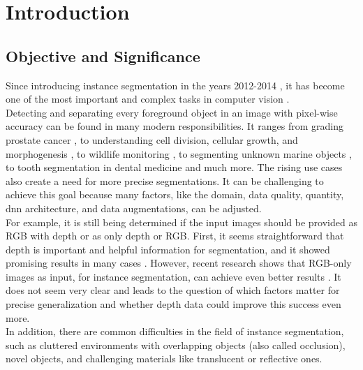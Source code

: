 
\chapter{Introduction}
\label{chap:kapitel1}



	\section{Objective and Significance}    %
	\label{sec:objective-and-importance}	
		Since introducing instance segmentation in the years 2012-2014 \cite{Yang2012}\cite{Silbermann2012}\cite{Hariharan2014}, it has become one of the most important and complex tasks in computer vision \cite{Sharma2022}. \\
		Detecting and separating every foreground object in an image with pixel-wise accuracy can be found in many modern responsibilities. It ranges from grading prostate cancer \cite{Hassan2022}, to understanding cell division, cellular growth, and morphogenesis \cite{Kar2022}, to wildlife monitoring \cite{Haucke2021}, to segmenting unknown marine objects \cite{Hu2024}, to tooth segmentation in dental medicine \cite{Brahmi2023} and much more. The rising use cases also create a need for more precise segmentations. It can be challenging to achieve this goal because many factors, like the domain, data quality, quantity, \ac{dnn} architecture, and data augmentations, can be adjusted.\\
		For example, it is still being determined if the input images should be provided as RGB with depth or as only depth or RGB. First, it seems straightforward that depth is important and helpful information for segmentation, and it showed promising results in many cases \cite{Danielczuk2019}\cite{Xie2021}. However, recent research shows that RGB-only images as input, for instance segmentation, can achieve even better results \cite{Raj2023}. It does not seem very clear and leads to the question of which factors matter for precise generalization and whether depth data could improve this success even more.\\
		In addition, there are common difficulties in the field of instance segmentation, such as cluttered environments with overlapping objects (also called occlusion), novel objects, and challenging materials like translucent or reflective ones.\\
